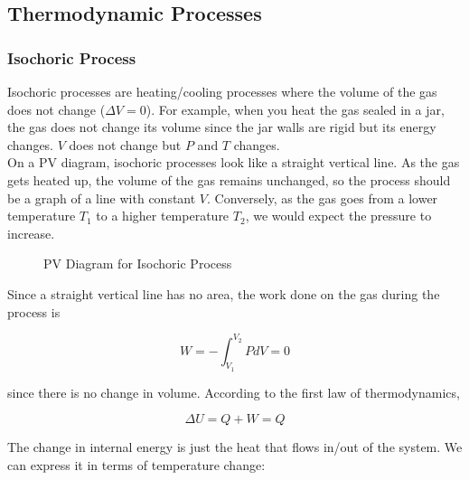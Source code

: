 \subsection{Thermodynamic Processes}

\subsubsection{Isochoric Process}

Isochoric processes are heating/cooling processes where the volume of the gas does not change ($\Delta V = 0$). For example, when you heat the gas sealed in a jar, the gas does not change its volume since the jar walls are rigid but its energy changes. $V$ does not change but $P$ and $T$ changes. \\

On a PV diagram, isochoric processes look like a straight vertical line. As the gas gets heated up, the volume of the gas remains unchanged, so the process should be a graph of a line with constant $V$. Conversely, as the gas goes from a lower temperature $T_1$ to a higher temperature $T_2$, we would expect the pressure to increase.

\begin{figure}[H]
	\centering
	\caption{PV Diagram for Isochoric Process}
\end{figure}

Since a straight vertical line has no area, the work done on the gas during the process is

$$W=-\int_{V_1}^{V_2}PdV=0$$

since there is no change in volume. According to the first law of thermodynamics,

$$\Delta U=Q+W=Q$$

The change in internal energy is just the heat that flows in/out of the system. We can express it in terms of temperature change:

